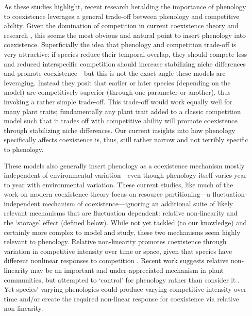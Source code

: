 \documentclass[11pt]{article}
\newcommand{\R}[1]{\label{}\linelabel{#1}}
\begin{document}
As these studies highlight, recent research heralding the importance of phenology to coexistence leverages a general trade-off between phenology and competitive ability. Given the domination of competition in current coexistence theory and research \citep{mcpeek2022coexistence}, this seems the most obvious and natural point to insert phenology into coexistence. Superficially the idea that phenology and competition trade-off is very attractive: if species reduce their temporal overlap, they should compete less and reduced interspecific competition should increase stabilizing niche differences and promote coexistence---but this is not the exact angle these models are leveraging. Instead they posit that earlier or later species (depending on the model) are competitively superior (through one parameter or another), thus invoking a rather simple trade-off. This trade-off would work equally well for many plant traits; fundamentally any plant trait added to a classic competition model such that it trades off with competitive ability will promote coexistence through stabilizing niche differences. Our current insights into how phenology specifically affects coexistence is, thus, still rather narrow and not terribly specific to phenology. 

These models also generally insert phenology as a coexistence mechanism mostly independent of environmental variation---even though phenology itself varies year to year with environmental variation. These current studies, like much of the work on modern coexistence theory focus on resource partitioning---a fluctuation-independent mechanism of coexistence---ignoring an additional suite of likely relevant mechanisms that are fluctuation dependent: relative
non-linearity and the `storage' effect (defined below). While not yet tackled (to our knowledge) and certainly more complex to model and study, these two mechanisms seem highly relevant to phenology. Relative non-linearity promotes coexistence through variation in competitive intensity over time or space, given that species have different nonlinear responses to competition \citep{CHESSON:1994vn,Chesson:2000vd}. Recent work suggests relative non-linearity may be an important and under-appreciated mechanism in plant communities, but attempted to `control' for phenology rather than consider it \citep{hallett2019rainfall}. Yet species' varying phenologies could produce varying competitive intensity over time and/or create the required non-linear response for coexistence via relative non-linearity. \R{definestorage2}
\end{document}
